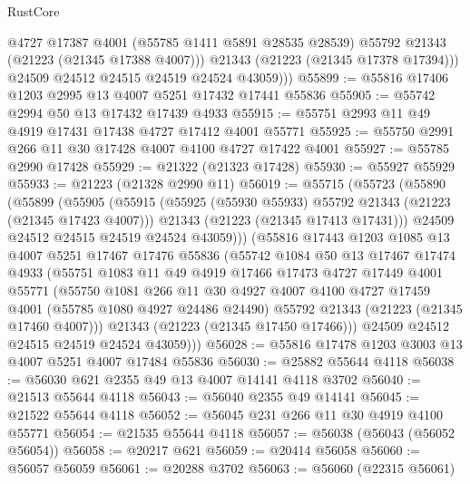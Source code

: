 \begin{lexlean}{RustCore}
\begin{coremodule}
              @4727
              @17387
              @4001
              (@55785 @1411 @5891 @28535 @28539)
              @55792
              @21343
              (@21223 (@21345 @17388 @4007)))
            @21343
            (@21223 (@21345 @17378 @17394)))
          @24509
          @24512
          @24515
          @24519
          @24524
          @43059)))
@55899 := @55816 @17406 @1203 @2995 @13 @4007 @5251 @17432 @17441 @55836
@55905 := @55742 @2994 @50 @13 @17432 @17439 @4933
@55915 := @55751 @2993 @11 @49 @4919 @17431 @17438 @4727 @17412 @4001 @55771
@55925 := @55750 @2991 @266 @11 @30 @17428 @4007 @4100 @4727 @17422 @4001
@55927 := @55785 @2990 @17428
@55929 := @21322 (@21323 @17428)
@55930 := @55927 @55929
@55933 := @21223 (@21328 @2990 @11)
@56019 := @55715
    (@55723
      (@55890
        (@55899
          (@55905
            (@55915
              (@55925 (@55930 @55933) @55792 @21343 (@21223 (@21345 @17423 @4007)))
              @21343
              (@21223 (@21345 @17413 @17431)))
            @24509
            @24512
            @24515
            @24519
            @24524
            @43059)))
      (@55816
        @17443
        @1203
        @1085
        @13
        @4007
        @5251
        @17467
        @17476
        @55836
        (@55742
          @1084
          @50
          @13
          @17467
          @17474
          @4933
          (@55751
            @1083
            @11
            @49
            @4919
            @17466
            @17473
            @4727
            @17449
            @4001
            @55771
            (@55750
              @1081
              @266
              @11
              @30
              @4927
              @4007
              @4100
              @4727
              @17459
              @4001
              (@55785 @1080 @4927 @24486 @24490)
              @55792
              @21343
              (@21223 (@21345 @17460 @4007)))
            @21343
            (@21223 (@21345 @17450 @17466)))
          @24509
          @24512
          @24515
          @24519
          @24524
          @43059)))
@56028 := @55816 @17478 @1203 @3003 @13 @4007 @5251 @4007 @17484 @55836
@56030 := @25882 @55644 @4118
@56038 := @56030 @621 @2355 @49 @13 @4007 @14141 @4118 @3702
@56040 := @21513 @55644 @4118
@56043 := @56040 @2355 @49 @14141
@56045 := @21522 @55644 @4118
@56052 := @56045 @231 @266 @11 @30 @4919 @4100 @55771
@56054 := @21535 @55644 @4118
@56057 := @56038 (@56043 (@56052 @56054))
@56058 := @20217 @621
@56059 := @20414 @56058
@56060 := @56057 @56059
@56061 := @20288 @3702
@56063 := @56060 (@22315 @56061)

\end{coremodule}
\end{lexlean}
